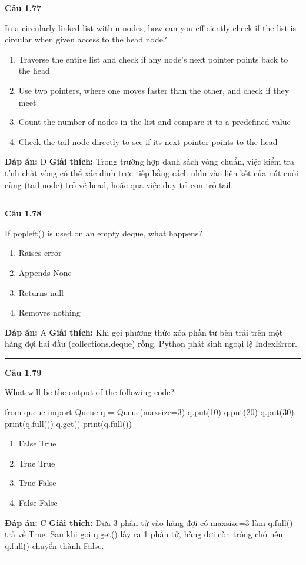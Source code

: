 \documentclass[11pt,a4paper]{article}
\newenvironment{question}[1]{%
  \par\vspace{1em}\noindent\textbf{\large Câu #1}\par\vspace{0.4em}
}{%
  \par\vspace{1em}\hrule\vspace{0.6em}
}
\newenvironment{choices}{%
  \begin{enumerate}[label=\textbf{\Alph*.},leftmargin=2.2em,itemsep=2pt,topsep=3pt]
}{%
  \end{enumerate}
}
\newcommand{\choice}{\item}
\newenvironment{codebox}{%
  \begin{tcolorbox}[colback=gray!8!white,colframe=gray!50!black,arc=1.5mm,boxrule=0.6pt,left=3mm,right=3mm,top=2.5mm,bottom=2.5mm]
  \ttfamily\small
}{%
  \end{tcolorbox}
}
\begin{document}
\begin{question}{1.77}
In a circularly linked list with n nodes, how can you efficiently check if the list is circular when given access to the head node?
\begin{choices}
\choice Traverse the entire list and check if any node's next pointer points back to the head
\choice Use two pointers, where one moves faster than the other, and check if they meet
\choice Count the number of nodes in the list and compare it to a predefined value
\choice Check the tail node directly to see if its next pointer points to the head
\end{choices}
\textbf{Đáp án:} D
\textbf{Giải thích:} Trong trường hợp danh sách vòng chuẩn, việc kiểm tra tính chất vòng có thể xác định trực tiếp bằng cách nhìn vào liên kết của nút cuối cùng (tail node) trỏ về head, hoặc qua việc duy trì con trỏ tail.
\end{question}

\begin{question}{1.78}
If popleft() is used on an empty deque, what happens?
\begin{choices}
\choice Raises error
\choice Appends None
\choice Returns null
\choice Removes nothing
\end{choices}
\textbf{Đáp án:} A
\textbf{Giải thích:} Khi gọi phương thức xóa phần tử bên trái trên một hàng đợi hai đầu (collections.deque) rỗng, Python phát sinh ngoại lệ IndexError.
\end{question}

\begin{question}{1.79}
What will be the output of the following code?
\begin{codebox}
from queue import Queue
q = Queue(maxsize=3)
q.put(10)
q.put(20)
q.put(30)
print(q.full())
q.get()
print(q.full())
\end{codebox}
\begin{choices}
\choice False True
\choice True True
\choice True False
\choice False False
\end{choices}
\textbf{Đáp án:} C
\textbf{Giải thích:} Đưa 3 phần tử vào hàng đợi có maxsize=3 làm q.full() trả về True. Sau khi gọi q.get() lấy ra 1 phần tử, hàng đợi còn trống chỗ nên q.full() chuyển thành False.
\end{question}
\end{document}
